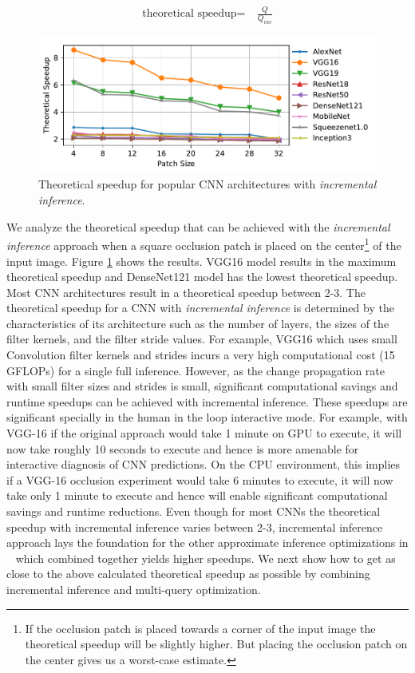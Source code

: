 \begin{align}
\label{eqn:redundancy_ratio}
\text{theoretical speedup} =&~ \frac{Q}{Q_{inc}}
\end{align}


\begin{figure}[t]
\includegraphics[width=\columnwidth]{images/redundancy_ratio}
\caption{Theoretical speedup for popular CNN architectures with \textit{incremental inference}.}
\label{fig:redundancy_ratio}
\end{figure}

We analyze the theoretical speedup that can be achieved with the \textit{incremental inference} approach when a square occlusion patch is placed on the center\footnote{If the occlusion patch is placed towards a corner of the input image the theoretical speedup will be slightly higher.
But placing the occlusion patch on the center gives us a worst-case estimate.} of the input image.
Figure \ref{fig:redundancy_ratio} shows the results.
VGG16 model results in the maximum theoretical speedup and DenseNet121 model has the lowest theoretical speedup.
Most CNN architectures result in a theoretical speedup between 2-3.
The theoretical speedup for a CNN with \textit{incremental inference} is determined by the characteristics of its architecture such as the number of layers, the sizes of the filter kernels, and the filter stride values.
For example, VGG16 which uses small Convolution filter kernels and strides incurs a very high computational cost (15 GFLOPs) for a single full inference.
However, as the change propagation rate with small filter sizes and strides is small, significant computational savings and runtime speedups can be achieved with incremental inference.
These speedups are significant specially in the human in the loop interactive mode.
For example, with VGG-16 if the original approach would take 1 minute on GPU to execute, it will now take roughly 10 seconds to execute and hence is more amenable for interactive diagnosis of CNN predictions.
On the CPU environment, this implies if a VGG-16 occlusion experiment would take 6 minutes to execute, it will now take only 1 minute to execute and hence will enable significant computational savings and runtime reductions.
Even though for most CNNs the theoretical speedup with incremental inference varies between 2-3, incremental inference approach lays the foundation for the other approximate inference optimizations in \system~ which combined together yields higher speedups.
We next show how to get as close to the above calculated theoretical speedup as possible by combining incremental inference and multi-query optimization.


